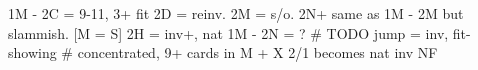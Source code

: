 1M - 2C = 9-11, 3+ fit
    2D = reinv. 2M = s/o. 2N+ same as 1M - 2M but slammish.
    [M = S] 2H = inv+, nat
1M - 2N = ?  # TODO
jump = inv, fit-showing  # concentrated, 9+ cards in M + X
2/1 becomes nat inv NF
